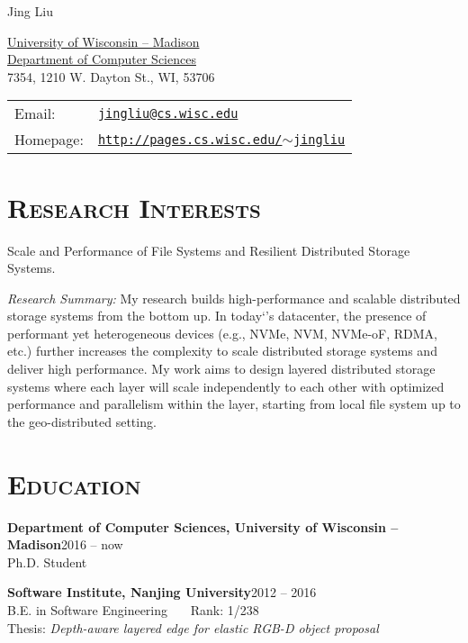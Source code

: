 \documentclass[10pt, letterpaper]{article}
\def\name{Jing Liu}
\renewenvironment{itemize}{
  \begin{list}{}{
    \setlength{\leftmargin}{1.2em}
    \setlength{\itemsep}{0.12em}
    \setlength{\parskip}{0pt}
    \setlength{\parsep}{0.12em}
  }
}{
  \end{list}
}
\begin{document}
{\huge \name}

\bigskip

\begin{minipage}{0.47\linewidth}
\hypersetup{urlcolor=black}
\href{http://www.wisc.edu}{University of Wisconsin -- Madison}\\
\href{http://www.cs.wisc.edu}{Department of Computer Sciences}\\
7354, 1210 W. Dayton St., WI, 53706
\end{minipage}
\begin{minipage}{0.45\linewidth}
\hypersetup{urlcolor=black}
\begin{tabular}{ll}
  Email: & \href{mailto:jingliu@cs.wisc.edu}{\tt jingliu@cs.wisc.edu}\\
  Homepage: & \href{http://pages.cs.wisc.edu/~jingliu}
  	{\tt http://pages.cs.wisc.edu/$\sim$jingliu}
\end{tabular}
\end{minipage}

\section*{\textsc{Research Interests}}

Scale and Performance of File Systems and Resilient Distributed Storage Systems.

\vspace{0.15cm}
\noindent
{\textit{Research Summary:}} 
    My research builds high-performance and scalable distributed storage systems from the bottom up. 
    In today`’s datacenter, the presence of performant yet heterogeneous devices (e.g., NVMe, NVM, NVMe-oF, RDMA, etc.) further increases the complexity to scale distributed storage systems and deliver high performance. My work aims to design layered distributed storage systems where each layer will scale independently to each other with optimized performance and parallelism within the layer, starting from local file system up to the geo-distributed setting. 
    


\section*{\textsc{Education}}
\begin{itemize}
  \item {\bf Department of Computer Sciences, University of Wisconsin -- Madison}\hfill 2016 --  now\\
    Ph.D. Student\\
  \item {\bf Software Institute, Nanjing University}\hfill 2012 -- 2016\\
    B.E. in Software Engineering ~~~Rank: 1/238 \\
    Thesis: {\it Depth-aware layered edge for elastic RGB-D object proposal}
\end{itemize}
\end{document}
